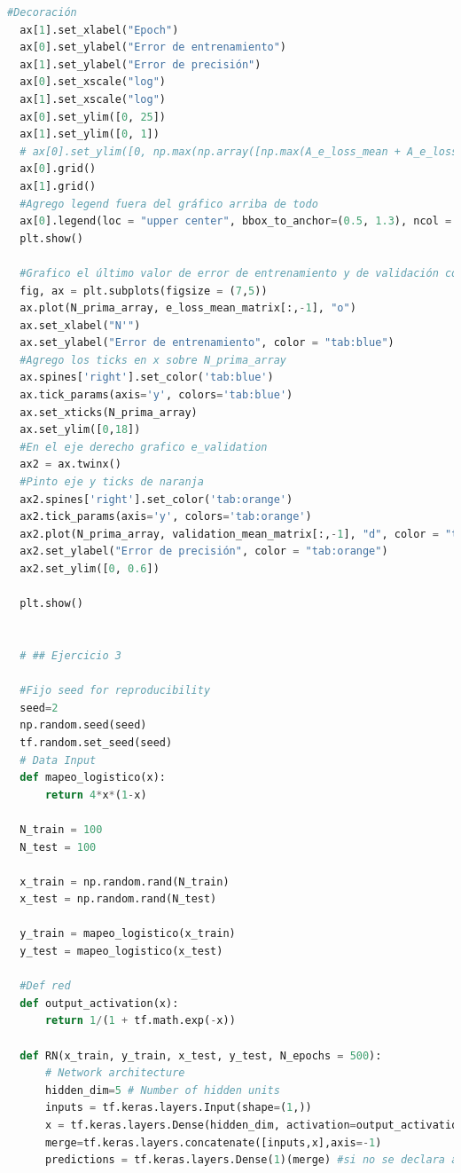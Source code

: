 \documentclass[aps,prb,twocolumn,superscriptaddress,floatfix,longbibliography]{revtex4-2}
\newcounter{para}
\begin{document}
\begin{lstlisting}[language=Python]
  #Decoración
  ax[1].set_xlabel("Epoch")
  ax[0].set_ylabel("Error de entrenamiento")
  ax[1].set_ylabel("Error de precisión")
  ax[0].set_xscale("log")
  ax[1].set_xscale("log")
  ax[0].set_ylim([0, 25])
  ax[1].set_ylim([0, 1])
  # ax[0].set_ylim([0, np.max(np.array([np.max(A_e_loss_mean + A_e_loss_std), np.max(B_e_loss_mean + B_e_loss_std)] ) )])
  ax[0].grid()
  ax[1].grid()
  #Agrego legend fuera del gráfico arriba de todo
  ax[0].legend(loc = "upper center", bbox_to_anchor=(0.5, 1.3), ncol = 3)
  plt.show()
  
  #Grafico el último valor de error de entrenamiento y de validación como función de N'
  fig, ax = plt.subplots(figsize = (7,5))
  ax.plot(N_prima_array, e_loss_mean_matrix[:,-1], "o")
  ax.set_xlabel("N'")
  ax.set_ylabel("Error de entrenamiento", color = "tab:blue")
  #Agrego los ticks en x sobre N_prima_array
  ax.spines['right'].set_color('tab:blue')
  ax.tick_params(axis='y', colors='tab:blue')
  ax.set_xticks(N_prima_array)
  ax.set_ylim([0,18])
  #En el eje derecho grafico e_validation
  ax2 = ax.twinx()
  #Pinto eje y ticks de naranja
  ax2.spines['right'].set_color('tab:orange')
  ax2.tick_params(axis='y', colors='tab:orange')
  ax2.plot(N_prima_array, validation_mean_matrix[:,-1], "d", color = "tab:orange")
  ax2.set_ylabel("Error de precisión", color = "tab:orange")
  ax2.set_ylim([0, 0.6])
  
  plt.show()
  
  
  # ## Ejercicio 3
  
  #Fijo seed for reproducibility 
  seed=2
  np.random.seed(seed)
  tf.random.set_seed(seed)
  # Data Input
  def mapeo_logistico(x):
      return 4*x*(1-x)
  
  N_train = 100
  N_test = 100
  
  x_train = np.random.rand(N_train)
  x_test = np.random.rand(N_test)
  
  y_train = mapeo_logistico(x_train)
  y_test = mapeo_logistico(x_test)
  
  #Def red
  def output_activation(x):
      return 1/(1 + tf.math.exp(-x))
  
  def RN(x_train, y_train, x_test, y_test, N_epochs = 500):
      # Network architecture
      hidden_dim=5 # Number of hidden units
      inputs = tf.keras.layers.Input(shape=(1,))
      x = tf.keras.layers.Dense(hidden_dim, activation=output_activation)(inputs)
      merge=tf.keras.layers.concatenate([inputs,x],axis=-1)
      predictions = tf.keras.layers.Dense(1)(merge) #si no se declara activation, se usa activation lineal
  

\end{lstlisting}
\end{document}
